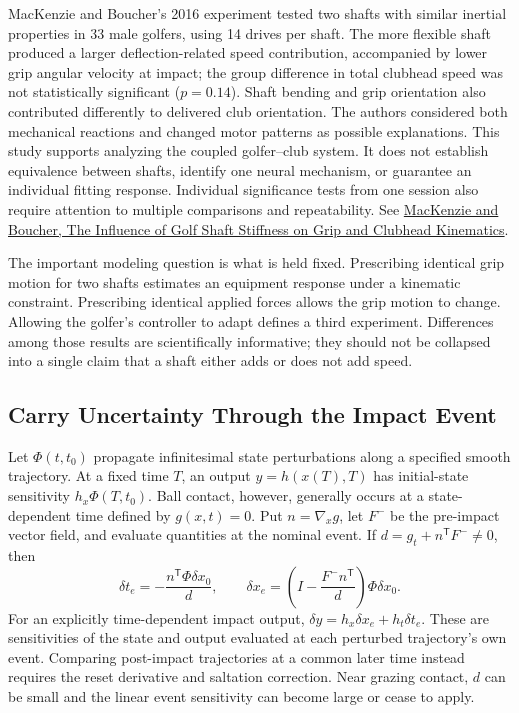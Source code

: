 MacKenzie and Boucher's 2016 experiment tested two shafts with similar inertial properties in 33 male golfers, using 14 drives per shaft. The more flexible shaft produced a larger deflection-related speed contribution, accompanied by lower grip angular velocity at impact; the group difference in total clubhead speed was not statistically significant ($p=0.14$). Shaft bending and grip orientation also contributed differently to delivered club orientation. The authors considered both mechanical reactions and changed motor patterns as possible explanations. This study supports analyzing the coupled golfer--club system. It does not establish equivalence between shafts, identify one neural mechanism, or guarantee an individual fitting response. Individual significance tests from one session also require attention to multiple comparisons and repeatability. See \href{https://doi.org/10.1080/02640414.2016.1157262}{MacKenzie and Boucher, The Influence of Golf Shaft Stiffness on Grip and Clubhead Kinematics}.

The important modeling question is what is held fixed. Prescribing identical grip motion for two shafts estimates an equipment response under a kinematic constraint. Prescribing identical applied forces allows the grip motion to change. Allowing the golfer's controller to adapt defines a third experiment. Differences among those results are scientifically informative; they should not be collapsed into a single claim that a shaft either adds or does not add speed.

\subsection{Carry Uncertainty Through the Impact Event}

Let $\Phi(t,t_0)$ propagate infinitesimal state perturbations along a specified smooth trajectory. At a fixed time $T$, an output $y=h(x(T),T)$ has initial-state sensitivity $h_x\Phi(T,t_0)$. Ball contact, however, generally occurs at a state-dependent time defined by $g(x,t)=0$. Put $n=\nabla_x g$, let $F^-$ be the pre-impact vector field, and evaluate quantities at the nominal event. If $d=g_t+n^{\mathsf T}F^-\ne0$, then
\begin{equation}
 \delta t_e=-\frac{n^{\mathsf T}\Phi\delta x_0}{d},\qquad
 \delta x_e=\left(I-\frac{F^-n^{\mathsf T}}{d}\right)\Phi\delta x_0.
\end{equation}
For an explicitly time-dependent impact output, $\delta y=h_x\delta x_e+h_t\delta t_e$. These are sensitivities of the state and output evaluated at each perturbed trajectory's own event. Comparing post-impact trajectories at a common later time instead requires the reset derivative and saltation correction. Near grazing contact, $d$ can be small and the linear event sensitivity can become large or cease to apply.


